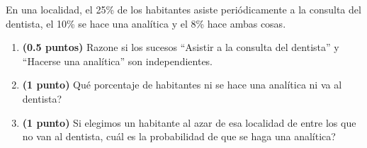 
En una localidad, el 25\% de los habitantes asiste periódicamente a la consulta del dentista, el 10\% se hace una analítica y el 8\% hace ambas cosas.
\begin{enumerate}[label=\alph*)]
\item \textbf{(0.5 puntos)} Razone si los sucesos ``Asistir a la consulta del dentista'' y ``Hacerse una analítica'' son independientes.
\item \textbf{(1 punto)} \textquestiondown{}Qué porcentaje de habitantes ni se hace una analítica ni va al dentista?
\item \textbf{(1 punto)} Si elegimos un habitante al azar de esa localidad de entre los que no van al dentista, \textquestiondown{}cuál es la probabilidad de que se haga una analítica?
\end{enumerate}
